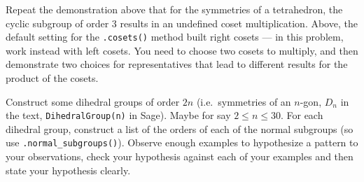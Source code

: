 \begin{sageverbatim}\end{sageverbatim}
%
%
Repeat the demonstration above that for the symmetries of a tetrahedron, the cyclic subgroup of order 3  results in an undefined coset multiplication.  Above, the default setting for the \verb?.cosets()? method built right cosets --- in this problem, work instead with left cosets.  You need to choose two cosets to multiply, and then demonstrate two choices for representatives that lead to different results for the product of the cosets.
\begin{sageverbatim}\end{sageverbatim}
%
%
Construct some dihedral groups of order $2n$ (i.e.\ symmetries of an $n$-gon, $D_{n}$ in the text, \verb?DihedralGroup(n)? in Sage).  Maybe for say $2\leq n \leq 30$.  For each dihedral group, construct a list of the orders of each of the normal subgroups (so use \verb?.normal_subgroups()?).  Observe enough examples to hypothesize a pattern to your observations, check your hypothesis against each of your examples and then state your hypothesis clearly.
%
